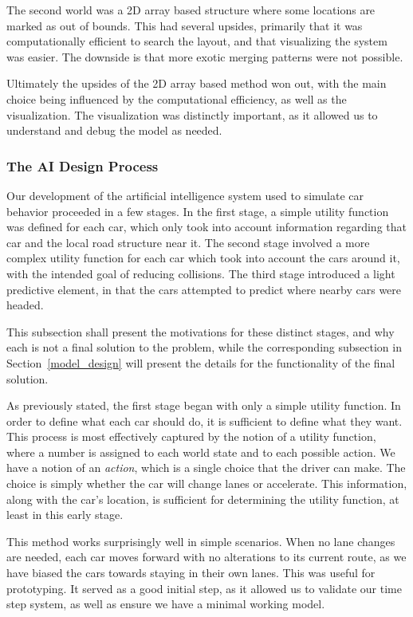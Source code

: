 \documentclass[a4paper, 11pt]{article}
\begin{document}
The second world was a 2D array based structure where some locations are marked as out of bounds. This had several upsides, primarily that it was computationally efficient to search the layout, and that visualizing the system was easier. The downside is that more exotic merging patterns were not possible. 

Ultimately the upsides of the 2D array based method won out, with the main choice being influenced by the computational efficiency, as well as the visualization. The visualization was distinctly important, as it allowed us to understand and debug the model as needed. 


\subsubsection{The AI Design Process}
\label{ai_design}
Our development of the artificial intelligence system used to simulate car behavior proceeded in a few stages. In the first stage,
a simple utility function was defined for each car, which only took into account information regarding that car and 
the local road structure near it. The second stage involved a more complex utility function for each car which took into account the cars around it, 
with the intended goal of reducing collisions. The third stage introduced a light predictive element, in that the cars attempted to 
predict where nearby cars were headed. 

This subsection shall present the motivations for these distinct stages, and why each is not a final solution to the problem, 
while the corresponding subsection in Section~\ref{model_design} will present the details for the functionality of the final solution.  

As previously stated, the first stage began with only a simple utility function. 
In order to define what each car should do, it is sufficient to define what they want. This process is most effectively 
captured by the notion of a utility function, where a number is assigned to each world state and to each possible action.
We have a notion of an \textit{action}, which is a single choice that the driver can make. 
The choice is simply whether the car will change lanes or accelerate.
This information, along with the car's location, is sufficient for determining the utility function, 
at least in this early stage. 

This method works surprisingly well in simple scenarios. When no lane changes are needed, each car moves forward with no alterations to its current route, 
as we have biased the cars towards staying in their own lanes. This was useful for prototyping. It served as a good initial step, as it allowed us to validate our time step system, as well as ensure 
we have a minimal working model. 
\end{document}
